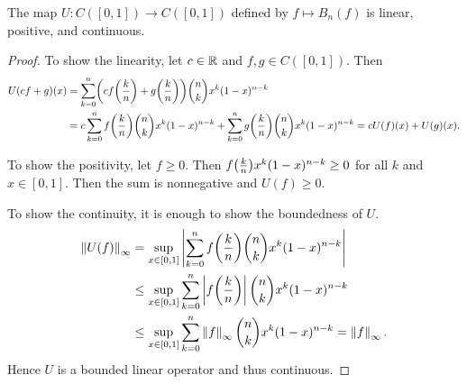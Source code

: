 \begin{proposition}
    The map $U:C([0,1])\to C([0,1])$ defined by $f\mapsto B_n(f)$ is linear, positive, and continuous.
\end{proposition}
\begin{proof}
    To show the linearity, let $c\in\mathbb{R}$ and $f,g\in C([0,1])$. Then 
    \begin{equation*}
        \begin{split}
            U(cf + g)(x) &= \sum_{k=0}^n \pth{cf\pth{\frac{k}{n}} + g\pth{\frac{k}{n}}}\binom{n}{k}x^k(1-x)^{n-k} \\
            &= c\sum_{k=0}^{n}f\pth{\frac{k}{n}}\binom{n}{k}x^k(1-x)^{n-k} + \sum_{k=0}^{n}g\pth{\frac{k}{n}}\binom{n}{k}x^k(1-x)^{n-k} 
            = cU(f)(x) + U(g)(x).
        \end{split}
    \end{equation*}

    To show the positivity, let $f\geq 0$. Then $f\pth{\frac{k}{n}}x^k(1-x)^{n-k}\geq 0$ for all $k$ 
    and $x\in[0,1]$. Then the sum is nonnegative and $U(f)\geq 0$. 

    To show the continuity, it is enough to show the boundedness of $U$. 
    \begin{equation*}
        \begin{split}
            \norm{U(f)}_\infty &= \sup_{x\in[0,1]}\abs{\sum_{k=0}^n f\pth{\frac{k}{n}}\binom{n}{k}x^k(1-x)^{n-k}} \\
            &\leq \sup_{x\in[0,1]}\sum_{k=0}^n \abs{f\pth{\frac{k}{n}}}\binom{n}{k}x^k(1-x)^{n-k} \\ 
            &\leq \sup_{x\in[0,1]}\sum_{k=0}^n \norm{f}_\infty\binom{n}{k}x^k(1-x)^{n-k} = \norm{f}_\infty.
        \end{split}
    \end{equation*}
    Hence $U$ is a bounded linear operator and thus continuous.
\end{proof}

